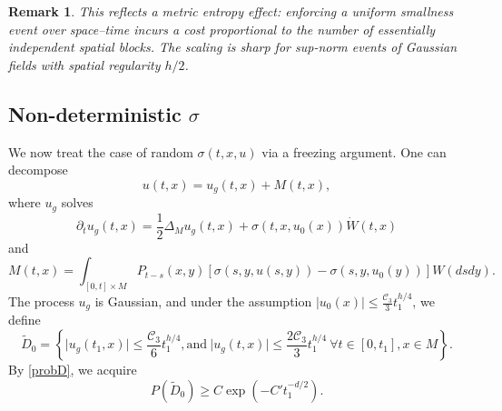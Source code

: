\documentclass[12pt]{amsart}
\newtheorem{remark}{Remark}[section]
\numberwithin{equation}{section}
\newcommand{\1}{\mathbf{1}}
\begin{document}
\begin{remark}
    This reflects a metric entropy effect: enforcing a uniform smallness event over space–time incurs a cost proportional to the number of essentially independent spatial blocks. The scaling is sharp for sup-norm events of Gaussian fields with spatial regularity $h/2$.
\end{remark}

\subsection*{Non-deterministic $\sigma$}
We now treat the case of random $\sigma(t,x,u)$ via a freezing argument. One can decompose
\[u(t,x)=u_g(t,x)+M(t,x),\]
where $u_g$ solves
\[\partial_t u_g(t,x)=\frac{1}{2}\Delta_M u_g(t,x)+\sigma(t,x,u_0(x))\dot{W}(t,x)\]
and 
\[M(t,x)=\int_{[0,t]\times M}P_{t-s}(x,y)[\sigma(s,y,u(s,y))-\sigma(s,y,u_0(y))]W(dsdy).\]
The process $u_g$ is Gaussian, and under the assumption $\vert u_0(x)\vert\leq \frac{\mathcal{C}_3}{3}t_1^{h/4}$, we define
\[\widetilde{D}_0=\left\lbrace\vert u_g(t_{1},x)\vert\leq \frac{\mathcal{C}_3}{6}t_1^{h/4},\text{and}~\vert u_g(t,x)\vert\leq\frac{2\mathcal{C}_3}{3}t_1^{h/4}~\forall t\in[0,t_{1}],x\in M\right\rbrace.\]
By \eqref{probD}, we acquire
\begin{equation}
\label{probD0}
P\left(\widetilde{D}_0\right)\geq C\exp\left(-C't_1^{-d/2}\right).
\end{equation}
\end{document}
